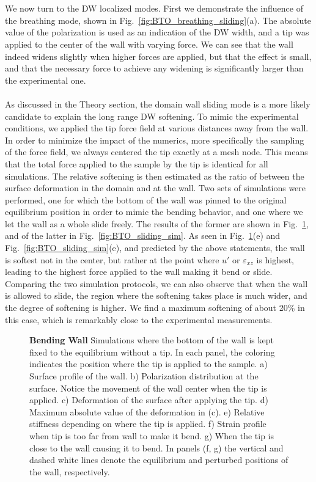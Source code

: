 \\\\
We now turn to the DW localized modes.
First we demonstrate the influence of the breathing mode, shown in Fig.~\ref{fig:BTO_breathing_sliding}(a).
The absolute value of the polarization is used as an indication of the DW width, and a tip was applied to the center of the wall with varying force.
We can see that the wall indeed widens slightly when higher forces are applied, but that the effect is small, and that the necessary force to achieve any widening is significantly larger than the experimental one.
\\\\
As discussed in the Theory section, the domain wall sliding mode is a more likely candidate to explain the long range DW softening.
To mimic the experimental conditions, we applied the tip force field at various distances away from the wall.
In order to minimize the impact of the numerics, more specifically the sampling of the force field, we always centered the tip exactly at a mesh node.
This means that the total force applied to the sample by the tip is identical for all simulations.
The relative softening is then estimated as the ratio of between the surface deformation in the domain and at the wall.
Two sets of simulations were performed, one for which the bottom of the wall was pinned to the original equilibrium position in order to mimic the bending behavior, and one where we let the wall as a whole slide freely.
The results of the former are shown in Fig.~\ref{fig:BTO_bending_sim}, and of the latter in Fig.~\ref{fig:BTO_sliding_sim}.
As seen in Fig.~\ref{fig:BTO_bending_sim}(e) and Fig.~\ref{fig:BTO_sliding_sim}(e), and predicted by the above statements, the wall is softest not in the center, but rather at the point where $u'$ or $\varepsilon_{xz}$ is highest, leading to the highest force applied to the wall making it bend or slide.
Comparing the two simulation protocols, we can also observe that when the wall is allowed to slide, the region where the softening takes place is much wider, and the degree of softening is higher.
We find a maximum softening of about 20\% in this case, which is remarkably close to the experimental measurements.
\begin{figure}
	\caption{\label{fig:BTO_bending_sim}{\bf Bending Wall} Simulations where the bottom of the wall is kept fixed to the equilibrium without a tip. In each panel, the coloring indicates the position where the tip is applied to the sample. a) Surface profile of the wall. b) Polarization distribution at the surface. Notice the movement of the wall center when the tip is applied. c) Deformation of the surface after applying the tip. d) Maximum absolute value of the deformation in (c). e) Relative stiffness depending on where the tip is applied. f) Strain profile when tip is too far from wall to make it bend. g) When the tip is close to the wall causing it to bend. In panels (f, g) the vertical and dashed white lines denote the equilibrium and perturbed positions of the wall, respectively.}
\end{figure}
